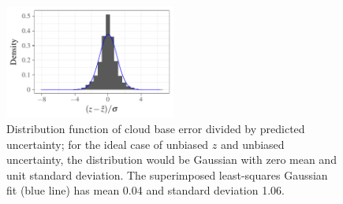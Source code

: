 \documentclass[essd,manuscript]{copernicus}\usepackage[]{graphicx}\usepackage[]{color}
\newenvironment{knitrout}{}{} %
\newcommand\CBH{\ensuremath{z}}
\begin{document}
\begin{figure}
  \centering
\begin{knitrout}
\color{fgcolor}

{\centering \includegraphics[width=0.5\textwidth]{figure/method-combo-eval-pull-1} 

}



\end{knitrout}
  \caption{Distribution function of cloud base error divided by predicted
    uncertainty; for the ideal case of unbiased \CBH{} and unbiased
    uncertainty, the distribution would be Gaussian with zero mean and unit
    standard deviation.  The superimposed least-squares Gaussian fit (blue line)
    has mean 0.04 and
    standard deviation 1.06.}
  \label{fig:pull}
\end{figure}


\end{document}
